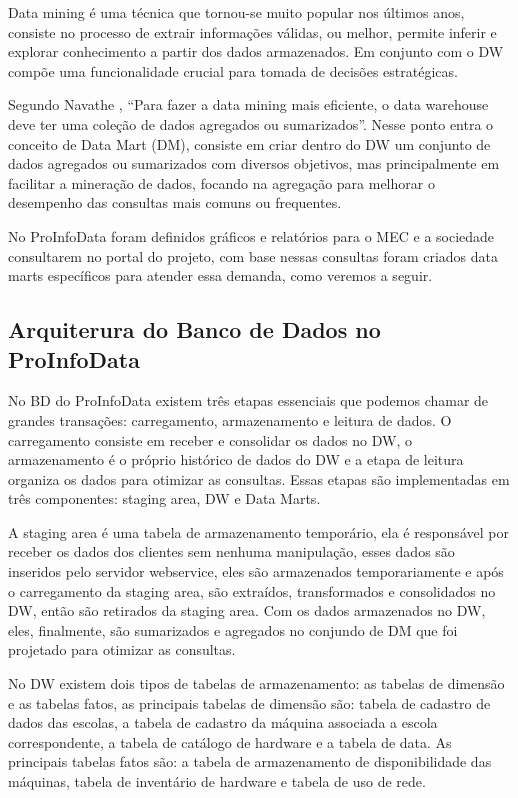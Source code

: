 \documentclass[a4paper,12pt]{article}
\begin{document}
Data mining é uma técnica que tornou-se muito popular nos últimos anos, consiste
no processo de extrair informações válidas, ou melhor, permite inferir e explorar
conhecimento a partir dos dados armazenados. Em conjunto com o DW compõe uma
funcionalidade crucial para tomada de decisões estratégicas.
 
Segundo Navathe \cite{Navathe}, “Para fazer a data mining mais eficiente, o data
warehouse deve ter uma coleção de dados agregados ou sumarizados”. Nesse ponto
entra o conceito de Data Mart (DM), consiste em criar dentro do DW um conjunto
de dados agregados ou sumarizados com diversos objetivos, mas principalmente em
facilitar a mineração de dados, focando na agregação para melhorar o desempenho
das consultas mais comuns ou frequentes.

No ProInfoData foram definidos gráficos e relatórios para o MEC e a sociedade
consultarem no portal do projeto, com base nessas consultas foram criados data
marts específicos para atender essa demanda, como veremos a seguir.

\subsection{\textbf{Arquiterura do Banco de Dados no ProInfoData}}

No BD do ProInfoData existem três etapas essenciais que podemos chamar de
grandes transações: carregamento, armazenamento e leitura de dados. O
carregamento consiste em receber e consolidar os dados no DW, o armazenamento é
o próprio histórico de dados do DW e a etapa de leitura organiza os dados para
otimizar as consultas. Essas etapas são implementadas em três componentes:
staging area, DW e Data Marts.

A staging area é uma tabela de armazenamento temporário, ela é responsável por
receber os dados dos clientes sem nenhuma manipulação, esses dados são inseridos
pelo servidor webservice, eles são armazenados temporariamente e após o
carregamento da staging area, são extraídos, transformados e consolidados no DW,
então são retirados da staging area. Com os dados armazenados no DW, eles,
finalmente, são sumarizados e agregados no conjundo de DM que foi projetado para
otimizar as consultas.

No DW existem dois tipos de tabelas de armazenamento: as tabelas de dimensão e as
tabelas fatos, as principais tabelas de dimensão são: tabela de cadastro de
dados das escolas, a tabela de cadastro da máquina associada a escola
correspondente, a tabela de catálogo de hardware e a tabela de data. As
principais tabelas fatos são: a tabela de armazenamento de disponibilidade das
máquinas, tabela de inventário de hardware e tabela de uso de rede.
\end{document}
